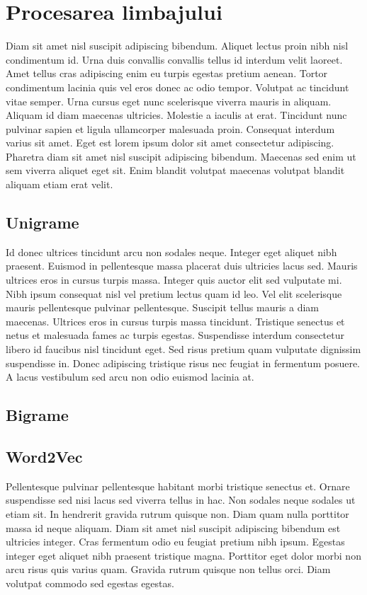 \chapter{Procesarea limbajului}

Diam sit amet nisl suscipit adipiscing bibendum. Aliquet lectus proin nibh nisl condimentum id. Urna duis convallis convallis tellus id interdum velit laoreet. Amet tellus cras adipiscing enim eu turpis egestas pretium aenean. Tortor condimentum lacinia quis vel eros donec ac odio tempor. Volutpat ac tincidunt vitae semper. Urna cursus eget nunc scelerisque viverra mauris in aliquam. Aliquam id diam maecenas ultricies. Molestie a iaculis at erat. Tincidunt nunc pulvinar sapien et ligula ullamcorper malesuada proin. Consequat interdum varius sit amet. Eget est lorem ipsum dolor sit amet consectetur adipiscing. Pharetra diam sit amet nisl suscipit adipiscing bibendum. Maecenas sed enim ut sem viverra aliquet eget sit. Enim blandit volutpat maecenas volutpat blandit aliquam etiam erat velit.

\section{Unigrame}

Id donec ultrices tincidunt arcu non sodales neque. Integer eget aliquet nibh praesent. Euismod in pellentesque massa placerat duis ultricies lacus sed. Mauris ultrices eros in cursus turpis massa. Integer quis auctor elit sed vulputate mi. Nibh ipsum consequat nisl vel pretium lectus quam id leo. Vel elit scelerisque mauris pellentesque pulvinar pellentesque. Suscipit tellus mauris a diam maecenas. Ultrices eros in cursus turpis massa tincidunt. Tristique senectus et netus et malesuada fames ac turpis egestas. Suspendisse interdum consectetur libero id faucibus nisl tincidunt eget. Sed risus pretium quam vulputate dignissim suspendisse in. Donec adipiscing tristique risus nec feugiat in fermentum posuere. A lacus vestibulum sed arcu non odio euismod lacinia at.
\section{Bigrame}


\section{Word2Vec}

Pellentesque pulvinar pellentesque habitant morbi tristique senectus et. Ornare suspendisse sed nisi lacus sed viverra tellus in hac. Non sodales neque sodales ut etiam sit. In hendrerit gravida rutrum quisque non. Diam quam nulla porttitor massa id neque aliquam. Diam sit amet nisl suscipit adipiscing bibendum est ultricies integer. Cras fermentum odio eu feugiat pretium nibh ipsum. Egestas integer eget aliquet nibh praesent tristique magna. Porttitor eget dolor morbi non arcu risus quis varius quam. Gravida rutrum quisque non tellus orci. Diam volutpat commodo sed egestas egestas.